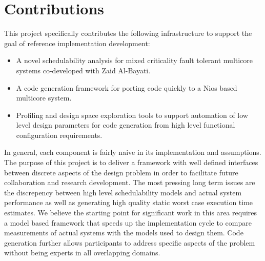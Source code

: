\section{Contributions}

	This project specifically contributes the following infrastructure to support the goal of reference implementation development:
	\begin{itemize}
	  \item A novel schedulability analysis for mixed criticality fault tolerant multicore systems co-developed with Zaid Al-Bayati.
	  \item A code generation framework for porting code quickly to a Nios based multicore system.
	  \item Profiling and design space exploration tools to support automation of low level design parameters for code generation from high level functional configuration requirements.
	\end{itemize}
	
	In general, each component is fairly naive in its implementation and assumptions. 
	The purpose of this project is to deliver a framework with well defined interfaces between discrete aspects of the design problem in order to facilitate future collaboration and research development. 
	The most pressing long term issues are the discrepency between high level schedulability models and actual system performance as well as generating high quality static worst case execution time estimates.
	We believe the starting point for significant work in this area requires a model based framework that speeds up the implementation cycle to compare measurements of actual systems with the models used to design them.
	Code generation further allows participants to address specific aspects of the problem without being experts in all overlapping domains.


